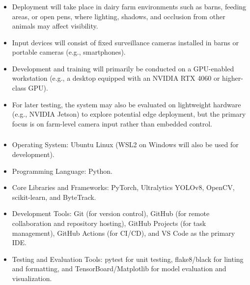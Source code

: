 \documentclass{article}
\begin{document}
\subsubsection*{\color{blue}{Hardware Environment}}
\begin{itemize}
    \item Deployment will take place in dairy farm environments such as barns, feeding areas, or open pens, 
          where lighting, shadows, and occlusion from other animals may affect visibility.
    \item Input devices will consist of fixed surveillance cameras installed in barns or portable cameras (e.g., smartphones).
    \item Development and training will primarily be conducted on a GPU-enabled workstation 
      (e.g., a desktop equipped with an NVIDIA RTX 4060 or higher-class GPU).
    \item For later testing, the system may also be evaluated on lightweight hardware (e.g., NVIDIA Jetson) 
          to explore potential edge deployment, but the primary focus is on farm-level camera input rather than embedded control.
\end{itemize}


\subsubsection*{\color{blue}{Software Environment}}
\begin{itemize}
    \item Operating System: Ubuntu Linux (WSL2 on Windows will also be used for development).
    \item Programming Language: Python.
    \item Core Libraries and Frameworks: PyTorch, Ultralytics YOLOv8, OpenCV, scikit-learn, and ByteTrack.
    \item Development Tools: Git (for version control), GitHub (for remote collaboration and repository hosting), 
      GitHub Projects (for task management), GitHub Actions (for CI/CD), and VS Code as the primary IDE.
    \item Testing and Evaluation Tools: pytest for unit testing, flake8/black for linting and formatting, 
          and TensorBoard/Matplotlib for model evaluation and visualization.
\end{itemize}

\end{document}
